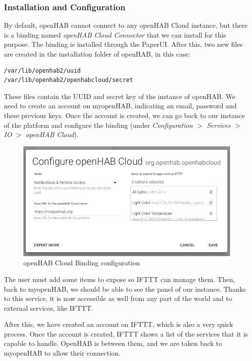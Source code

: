 \subsubsection{Installation and Configuration}
By default, openHAB cannot connect to any openHAB Cloud instance, but there is a binding named \textit{openHAB Cloud Connector}
that we can install for this purpose. The binding is installed through the PaperUI. After this, two new files are created in the installation
folder of openHAB, in this case:

\begin{lstlisting}[style=Consola]
/var/lib/openhab2/uuid
/var/lib/openhab2/openhabcloud/secret
\end{lstlisting}

These files contain the UUID and secret key of the instance of openHAB. We need to create an account on myopenHAB, indicating an
email, password and these previous keys. Once the account is created, we can go back to our instance of the platform and configure
the binding (under \textit{Configuration $>$ Services $>$ IO $>$ openHAB Cloud}).

\begin{figure}
	\centering
	\includegraphics[width=1\textwidth]{images/Chapter_06/openhab-cloud-binding-conf.png}
	\caption{openHAB Cloud Binding configuration}
	\label{fig:openhab-cloud-binding-conf}
\end{figure}

The user must add some items to expose so IFTTT can manage them. Then, back to myopenHAB, we should be able to see the panel
of our instance. Thanks to this service, it is now accessible as well from any part of the world and to external services, like IFTTT.

After this, we have created an account on IFTTT, which is also a very quick process. Once the account is created, IFTTT shows a list
of the services that it is capable to handle. OpenHAB is between them, and we are taken back to myopenHAB to allow their connection.

